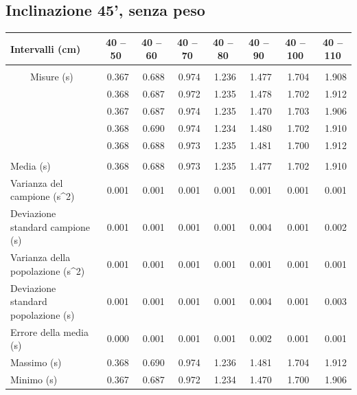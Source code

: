 \documentclass[12pt]{article} %
\begin{document}
	\subsection {Inclinazione 45', senza peso}
		\begin{table}[H]
			\begin{tabular}{|l|r|r|r|r|r|r|r|}
			\hline
			Intervalli (cm) & \multicolumn{1}{c|}{40 – 50} & \multicolumn{1}{c|}{40 – 60} & \multicolumn{1}{c|}{40 – 70} & \multicolumn{1}{c|}{40 – 80 } & \multicolumn{1}{c|}{40 – 90} & \multicolumn{1}{c|}{40 – 100} & \multicolumn{1}{c|}{40 – 110} \\ \hline
			 & \multicolumn{ 7}{l|}{} \\ \hline
			\multicolumn{ 1}{|c|}{Misure (s)} & 0.367 & 0.688 & 0.974 & 1.236 & 1.477 & 1.704 & 1.908 \\ \cline{ 2- 8}
			\multicolumn{ 1}{|l|}{} & 0.368 & 0.687 & 0.972 & 1.235 & 1.478 & 1.702 & 1.912 \\ \cline{ 2- 8}
			\multicolumn{ 1}{|l|}{} & 0.367 & 0.687 & 0.974 & 1.235 & 1.470 & 1.703 & 1.906 \\ \cline{ 2- 8}
			\multicolumn{ 1}{|l|}{} & 0.368 & 0.690 & 0.974 & 1.234 & 1.480 & 1.702 & 1.910 \\ \cline{ 2- 8}
			\multicolumn{ 1}{|l|}{} & 0.368 & 0.688 & 0.973 & 1.235 & 1.481 & 1.700 & 1.912 \\ \hline
			 & \multicolumn{ 7}{c|}{} \\ \hline
			Media (s) & 0.368 & 0.688 & 0.973 & 1.235 & 1.477 & 1.702 & 1.910 \\ \hline
			Varianza del campione (s^2) & 0.001 & 0.001 & 0.001 & 0.001 & 0.001 & 0.001 & 0.001 \\ \hline
			Deviazione standard campione (s) & 0.001 & 0.001 & 0.001 & 0.001 & 0.004 & 0.001 & 0.002 \\ \hline
			Varianza della popolazione (s^2) & 0.001 & 0.001 & 0.001 & 0.001 & 0.001 & 0.001 & 0.001 \\ \hline
			Deviazione standard popolazione (s) & 0.001 & 0.001 & 0.001 & 0.001 & 0.004 & 0.001 & 0.003 \\ \hline
			Errore della media (s) & 0.000 & 0.001 & 0.001 & 0.001 & 0.002 & 0.001 & 0.001 \\ \hline
			Massimo (s) & 0.368 & 0.690 & 0.974 & 1.236 & 1.481 & 1.704 & 1.912 \\ \hline
			Minimo (s) & 0.367 & 0.687 & 0.972 & 1.234 & 1.470 & 1.700 & 1.906 \\ \hline
			\end{tabular}

		\label{45n}
		\end{table}
		
\end{document}
